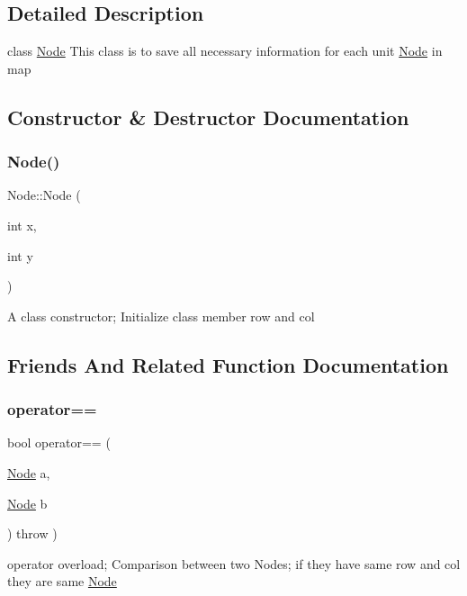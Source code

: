 \subsection{Detailed Description}
class \hyperlink{classNode}{Node} This class is to save all necessary information for each unit \hyperlink{classNode}{Node} in map 

\subsection{Constructor \& Destructor Documentation}
\mbox{\label{classNode_a23a19f53dfbb18fec58cdac90de3d144}} 
\subsubsection{\texorpdfstring{Node()}{Node()}}
{\footnotesize\ttfamily Node\+::\+Node (\begin{DoxyParamCaption}\item[{int}]{x,  }\item[{int}]{y }\end{DoxyParamCaption})\hspace{0.3cm}{\ttfamily [inline]}}

A class constructor; Initialize class member row and col 

\subsection{Friends And Related Function Documentation}
\mbox{\label{classNode_a25c0d19e60219456d5215abc584df43f}} 
\subsubsection{\texorpdfstring{operator==}{operator==}}
{\footnotesize\ttfamily bool operator== (\begin{DoxyParamCaption}\item[{\hyperlink{classNode}{Node}}]{a,  }\item[{\hyperlink{classNode}{Node}}]{b }\end{DoxyParamCaption}) throw  ) \hspace{0.3cm}{\ttfamily [friend]}}

operator overload; Comparison between two Nodes; if they have same row and col they are same \hyperlink{classNode}{Node} 

